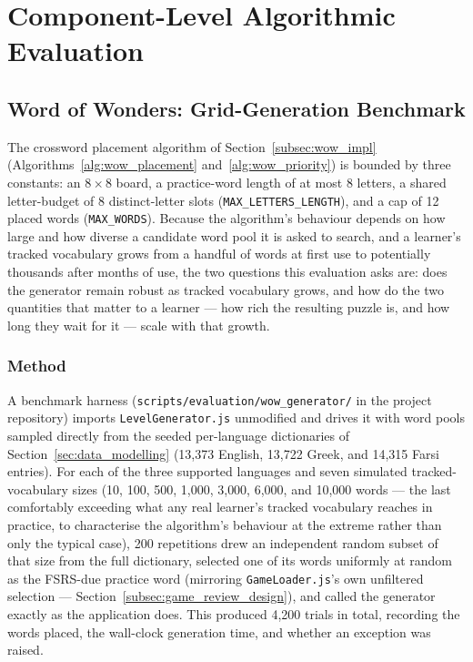\section{Component-Level Algorithmic Evaluation}
\label{sec:component_eval}

    \subsection{Word of Wonders: Grid-Generation Benchmark}
    \label{subsec:wow_eval}

    The crossword placement algorithm of Section~\ref{subsec:wow_impl} (Algorithms~\ref{alg:wow_placement} and~\ref{alg:wow_priority}) is bounded by three constants: an $8\times8$ board, a practice-word length of at most 8 letters, a shared letter-budget of 8 distinct-letter slots (\texttt{MAX\_LETTERS\_LENGTH}), and a cap of 12 placed words (\texttt{MAX\_WORDS}). Because the algorithm's behaviour depends on how large and how diverse a candidate word pool it is asked to search, and a learner's tracked vocabulary grows from a handful of words at first use to potentially thousands after months of use, the two questions this evaluation asks are: does the generator remain robust as tracked vocabulary grows, and how do the two quantities that matter to a learner --- how rich the resulting puzzle is, and how long they wait for it --- scale with that growth.

    \subsubsection{Method}
    \label{subsubsec:wow_eval_method}
    A benchmark harness (\texttt{scripts/evaluation/wow\_generator/} in the project repository) imports \texttt{LevelGenerator.js} unmodified and drives it with word pools sampled directly from the seeded per-language dictionaries of Section~\ref{sec:data_modelling} (13,373 English, 13,722 Greek, and 14,315 Farsi entries). For each of the three supported languages and seven simulated tracked-vocabulary sizes (10, 100, 500, 1{,}000, 3{,}000, 6{,}000, and 10{,}000 words --- the last comfortably exceeding what any real learner's tracked vocabulary reaches in practice, to characterise the algorithm's behaviour at the extreme rather than only the typical case), 200 repetitions drew an independent random subset of that size from the full dictionary, selected one of its words uniformly at random as the FSRS-due practice word (mirroring \texttt{GameLoader.js}'s own unfiltered selection --- Section~\ref{subsec:game_review_design}), and called the generator exactly as the application does. This produced 4{,}200 trials in total, recording the words placed, the wall-clock generation time, and whether an exception was raised.

